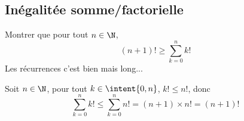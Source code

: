 \subsection{Inégalitée somme/factorielle}

\begin{exercice}
Montrer que pour tout $n\in \N$, $$(n+1)! \geq \sum_{k=0}^n k! $$
\footnotesize{Les récurrences c'est bien mais long...}
\end{exercice}



\begin{correction}
Soit $n\in \N$, pour tout $k\in\intent{0,n} $, $k! \leq n! $, donc 
$$\sum_{k=0}^n k! \leq \sum_{k=0}^n n! = (n+1) \times  n ! =(n+1)!$$
\end{correction}